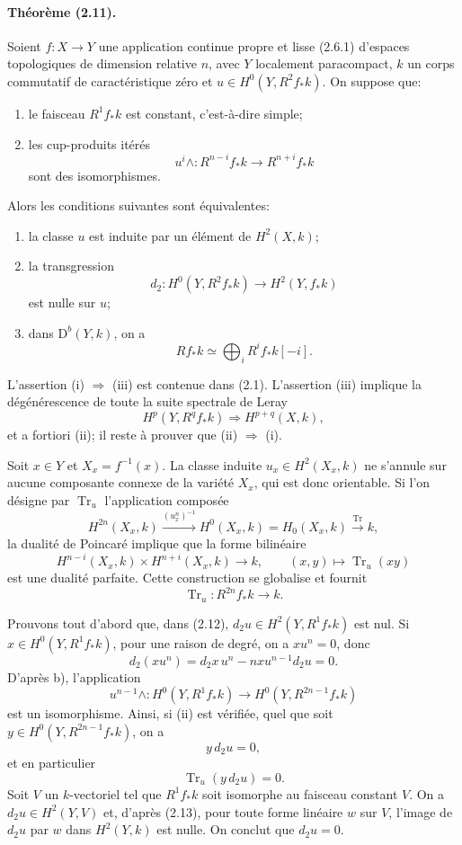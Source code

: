 \documentclass[10pt]{article}
\providecommand{\Tr}{\operatorname{Tr}}
\providecommand{\D}{\mathrm D}
\begin{document}
\paragraph{Théorème (2.11).} Soient $f:X\to Y$ une application continue propre et lisse (2.6.1) d'espaces topologiques de dimension relative $n$, avec $Y$ localement paracompact, $k$ un corps commutatif de caractéristique zéro et
$u\in H^0(Y,R^2f_*k)$. On suppose que:
\begin{enumerate}[label=\alph*)]
\item le faisceau $R^1f_*k$ est constant, c'est-à-dire simple;
\item les cup-produits itérés
\[
 u^i\wedge:R^{n-i}f_*k\longrightarrow R^{n+i}f_*k
\]
sont des isomorphismes.
\end{enumerate}
Alors les conditions suivantes sont équivalentes:
\begin{enumerate}[label=(\roman*)]
\item la classe $u$ est induite par un élément de $H^2(X,k)$;
\item la transgression
\[
d_2:H^0(Y,R^2f_*k)\longrightarrow H^2(Y,f_*k)
\]
est nulle sur $u$;
\item dans $\D^b(Y,k)$, on a
\[
Rf_*k\simeq\bigoplus_iR^if_*k[-i].
\]
\end{enumerate}
L'assertion (i) $\Rightarrow$ (iii) est contenue dans (2.1). L'assertion (iii) implique la dégénérescence de toute la suite spectrale de Leray
\[
\tag{2.12}
H^p(Y,R^qf_*k)\Longrightarrow H^{p+q}(X,k),
\]
et a fortiori (ii); il reste à prouver que (ii) $\Rightarrow$ (i).

Soit $x\in Y$ et $X_x=f^{-1}(x)$. La classe induite $u_x\in H^2(X_x,k)$ ne s'annule sur aucune composante connexe de la variété $X_x$, qui est donc orientable. Si l'on désigne par $\Tr_u$ l'application composée
\[
H^{2n}(X_x,k)\xrightarrow{(u_x^n)^{-1}}H^0(X_x,k)=H_0(X_x,k)\xrightarrow{\Tr}k,
\]
la dualité de Poincaré implique que la forme bilinéaire
\[
H^{n-i}(X_x,k)\times H^{n+i}(X_x,k)\longrightarrow k,
\qquad (x,y)\longmapsto \Tr_u(xy)
\]
est une dualité parfaite. Cette construction se globalise et fournit
\[
\Tr_u:R^{2n}f_*k\longrightarrow k.
\]

Prouvons tout d'abord que, dans (2.12), $d_2u\in H^2(Y,R^1f_*k)$ est nul. Si $x\in H^0(Y,R^1f_*k)$, pour une raison de degré, on a $xu^n=0$, donc
\[
d_2(xu^n)=d_2x\,u^n-nxu^{n-1}d_2u=0.
\]
D'après b), l'application
\[
 u^{n-1}\wedge:H^0(Y,R^1f_*k)\longrightarrow H^0(Y,R^{2n-1}f_*k)
\]
est un isomorphisme. Ainsi, si (ii) est vérifiée, quel que soit $y\in H^0(Y,R^{2n-1}f_*k)$, on a
\[
y\,d_2u=0,
\]
et en particulier
\[
\tag{2.13}
\Tr_u(y\,d_2u)=0.
\]
Soit $V$ un $k$-vectoriel tel que $R^1f_*k$ soit isomorphe au faisceau constant $V$. On a $d_2u\in H^2(Y,V)$ et, d'après (2.13), pour toute forme linéaire $w$ sur $V$, l'image de $d_2u$ par $w$ dans $H^2(Y,k)$ est nulle. On conclut que $d_2u=0$.
\end{document}
